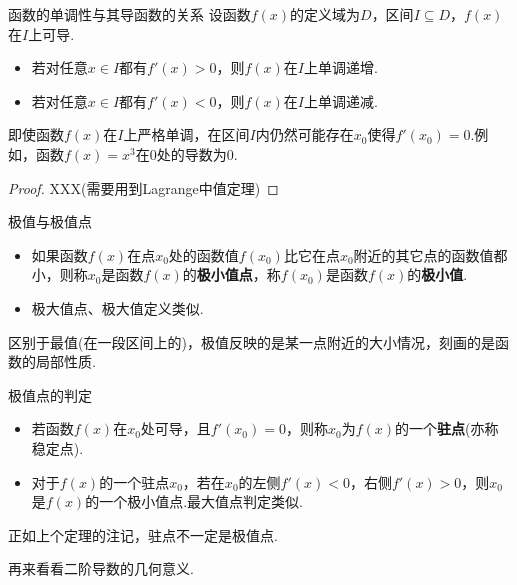 \documentclass[lang=cn, zihao=5]{elegantbook}
\begin{document}
\begin{theorem}{函数的单调性与其导函数的关系}
	设函数$f(x)$的定义域为$D$，区间$I \subseteq D$，$f(x)$在$I$上可导.
	\begin{itemize}
		\item 若对任意$x \in I$都有$f'(x)>0$，则$f(x)$在$I$上单调递增.
		\item 若对任意$x \in I$都有$f'(x)<0$，则$f(x)$在$I$上单调递减.
	\end{itemize}
\end{theorem}
\begin{remark}
	即使函数$f(x)$在$I$上严格单调，在区间$I$内仍然可能存在$x_0$使得$f'(x_0)=0$.例如，函数$f(x)=x^3$在$0$处的导数为$0$.
\end{remark}
\begin{proof}
	XXX(需要用到Lagrange中值定理)
\end{proof}

\begin{definition}{极值与极值点}
	\begin{itemize}
		\item 如果函数$f(x)$在点$x_0$处的函数值$f(x_0)$比它在点$x_0$附近的其它点的函数值都小，则称$x_0$是函数$f(x)$的\textbf{极小值点}，称$f(x_0)$是函数$f(x)$的\textbf{极小值}.
		\item 极大值点、极大值定义类似.
	\end{itemize}
\end{definition}
\begin{remark}
	区别于最值(在一段区间上的)，极值反映的是某一点附近的大小情况，刻画的是函数的局部性质.
\end{remark}

\begin{theorem}{极值点的判定}
	\begin{itemize}
		\item 若函数$f(x)$在$x_0$处可导，且$f'(x_0)=0$，则称$x_0$为$f(x)$的一个\textbf{驻点}(亦称稳定点).
		\item 对于$f(x)$的一个驻点$x_0$，若在$x_0$的左侧$f'(x)<0$，右侧$f'(x)>0$，则$x_0$是$f(x)$的一个极小值点.最大值点判定类似.
	\end{itemize}
\end{theorem}
\begin{remark}
	正如上个定理的注记，驻点不一定是极值点.
\end{remark}

再来看看二阶导数的几何意义.
\end{document}
